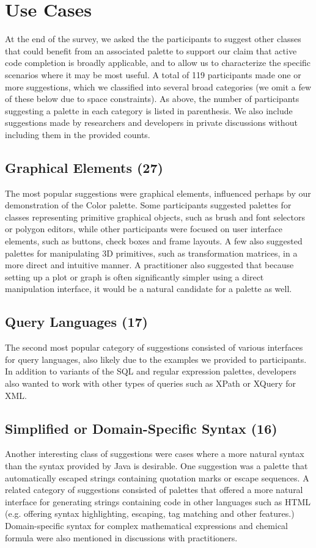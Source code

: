 \documentclass[10pt, conference, compsocconf]{IEEEtran}
\begin{document}
\section{Use Cases}
At the end of the survey, we asked the the participants to suggest other classes that could benefit from an associated palette to support our claim that active code completion is broadly applicable, and to allow us to characterize the specific scenarios where it may be most useful. A total of 119 participants made one or more suggestions, which we classified into several broad categories (we omit a few of these below due to space constraints). As above, the number of participants suggesting a palette in each category is listed in parenthesis. We also include suggestions made by researchers and developers in private discussions without including them in the provided counts.

\subsection{Graphical Elements (27)}
The most popular suggestions were graphical elements, influenced perhaps by our demonstration of the Color palette. Some participants suggested palettes for classes representing primitive graphical objects, such as brush and font selectors or polygon editors, while other participants were focused on user interface elements, such as buttons, check boxes and frame layouts. A few also suggested palettes for manipulating 3D primitives, such as transformation matrices, in a more direct and intuitive manner. A practitioner also suggested that because setting up a plot or graph is often significantly simpler using a direct manipulation interface, it would be a natural candidate for a palette as well.

\subsection{Query Languages (17)}
The second most popular category of suggestions consisted of various interfaces for query languages, also likely due to the examples we provided to participants. In addition to variants of the SQL and regular expression palettes, developers also wanted to work with other types of queries such as XPath or XQuery for XML.

\subsection{Simplified or Domain-Specific Syntax (16)}
Another interesting class of suggestions were cases where a more natural syntax than the syntax provided by Java is desirable. One suggestion was a palette that automatically escaped strings containing quotation marks or escape sequences. A related category of suggestions consisted of palettes that offered a more natural interface for generating strings containing code in other languages such as HTML (e.g. offering syntax highlighting, escaping,  tag matching and other features.) Domain-specific syntax for complex mathematical expressions and chemical formula were also mentioned in discussions with practitioners.
\end{document}
